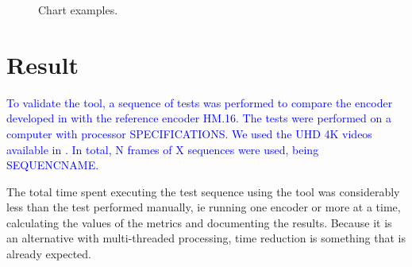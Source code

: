 \documentclass[journal]{IEEEtran}
\begin{document}
\FloatBarrier
\begin{figure}[!htb]
	\centering
	\caption{Chart examples.}
	\quad %
\end{figure}
\FloatBarrier

	


\section{Result}
\textcolor{blue}{
To validate the tool, a sequence of tests was performed to compare the encoder developed in \cite{oliveira:16} with the reference encoder HM.16. The tests were performed on a computer with processor SPECIFICATIONS. We used the UHD 4K videos available in \cite{sjtu:17}. In total, N frames of X sequences were used, being SEQUENCNAME.
}

The total time spent executing the test sequence using the tool was considerably less than the test performed manually, ie running one encoder or more at a time, calculating the values of the metrics and documenting the results. Because it is an alternative with multi-threaded processing, time reduction is something that is already expected.






\end{document}
